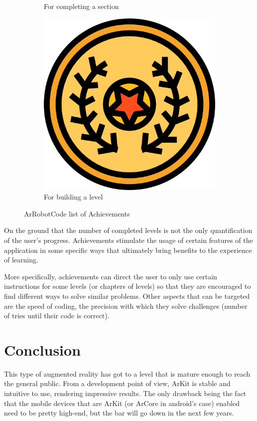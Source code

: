 \documentclass[12 pct]{report}
\begin{document}
\begin{figure}[H]
\begin{subfigure}[b]{0.3\linewidth}
    \caption{For completing a section }
  \end{subfigure}
  \begin{subfigure}[b]{0.3\linewidth}
    \includegraphics[width=\linewidth]{ArRobotCodeAchiv4}
    \caption{For building a level}
  \end{subfigure}
  \caption{ ArRobotCode list of Achievements}
  \label{fig:coffee3}
\end{figure}

On the ground that the number of completed levels is not the only quantification of the user's progress. Achievements stimulate the usage of certain features of the application in some specific ways that ultimately bring benefits to the experience of learning.

More specifically, achievements can direct the user to only use certain instructions for some levels (or chapters of levels) so that they are encouraged to find different ways to solve similar problems. Other aspects that can be targeted are the speed of coding, the precision with which they solve challenges (number of tries until their code is correct).

\section{Conclusion}
This type of augmented reality has got to a level that is mature enough to reach the general public. From a development point of view, ArKit is stable and intuitive to use, rendering impressive results. The only drawback being the fact that the mobile devices that are ArKit (or ArCore in android's case) enabled need to be pretty high-end, but the bar will go down in the next few years. 
\end{document}
